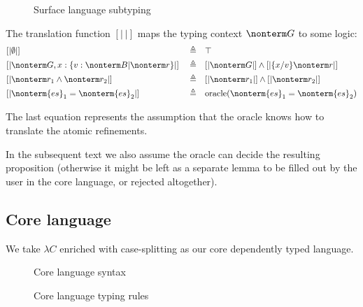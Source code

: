 \documentclass[a4paper]{article}
\begin{document}
\begin{figure}[ht]
  \footnotesize
  \caption{Surface language subtyping}
  \label{fig:surface_subtyping}
\end{figure}

The translation function $[|\ |]$ maps the typing context $\nonterm G$ to some logic:
\begin{equation}
\begin{aligned}
  & [| \emptyset |]                                         && \triangleq && \top																						  \\
  & [| \nonterm G, x : \{ v : \nonterm B | \nonterm r \} |] && \triangleq && [| \nonterm G |] \land [| \{x/v\} \nonterm r |]  \\
  & [| \nonterm r_1 \land \nonterm r_2 |]                   && \triangleq && [| \nonterm r_1 |] \land [| \nonterm r_2 |]      \\
  & [| \nonterm{es}_1 = \nonterm{es}_2 |]                   && \triangleq && \text{oracle}(\nonterm{es}_1 = \nonterm{es}_2)   \\
\end{aligned}
\end{equation}

The last equation represents the assumption
that the oracle knows how to translate the atomic refinements.


In the subsequent text we also assume the oracle can decide the resulting proposition
(otherwise it might be left as a separate lemma to be filled out by the user in the core language, or rejected altogether).

\subsection{Core language}

We take $\lambda C$ \cite{Nederpelt14} enriched with case-splitting as our core dependently typed language.

\begin{figure}[ht]
  \footnotesize
  \caption{Core language syntax}
  \label{fig:core_syntax}
\end{figure}

\begin{figure}[ht]
  \footnotesize
  \caption{Core language typing rules}
  \label{fig:core_typing}
\end{figure}
\end{document}
